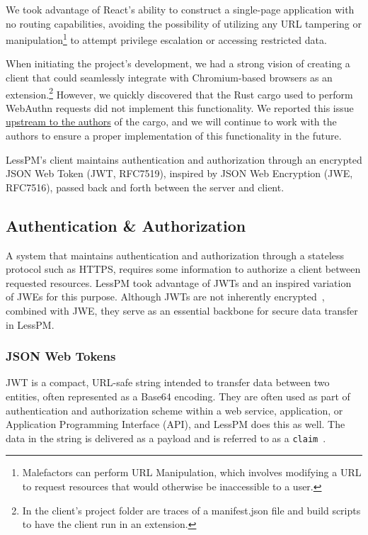 We took advantage of React's ability to construct a single-page application with
no routing capabilities, avoiding the possibility of utilizing any URL tampering
or manipulation\footnote{
  Malefactors can perform URL Manipulation, which involves modifying a URL to
  request resources that would otherwise be inaccessible to a user.
} to attempt privilege escalation or
accessing restricted data.

When initiating the project's development, we had a strong vision of creating
a client that could seamlessly integrate with Chromium-based browsers as
an extension.\footnote{
  In the client's project folder are traces of a manifest.json file and build
  scripts to have the client run in an extension.
}
However, we quickly discovered that the Rust cargo used to perform WebAuthn
requests did not implement this functionality.
We reported this issue
\href{https://github.com/kanidm/webauthn-rs/issues/288}{upstream to the authors}
of the cargo, and we will continue to work with the authors to ensure a proper
implementation of this functionality in the future.

LessPM's client maintains authentication and authorization through an
encrypted JSON Web Token (JWT, RFC7519), inspired by JSON Web
Encryption (JWE, RFC7516), passed back and forth between the server and client.


\subsection{Authentication \& Authorization}\label{subsec:auth-and-auth}
A system that maintains authentication and authorization through a stateless
protocol such as HTTPS, requires some information to authorize a
client between requested resources.
LessPM took advantage of JWTs and an inspired variation of JWEs for this
purpose.
Although JWTs are not inherently encrypted~\cite{RFC7519}, combined with JWE,
they serve as an essential backbone for secure data transfer in LessPM\@.

\subsubsection{JSON Web Tokens}
JWT is a compact, URL-safe string intended to transfer data between two
entities, often represented as a Base64 encoding.
They are often used as part of authentication and authorization scheme within
a web service, application, or Application Programming Interface (API), and
LessPM does this as well.
The data in the string is delivered as a payload and is referred to as a
\texttt{claim}~\cite{RFC7519}.

